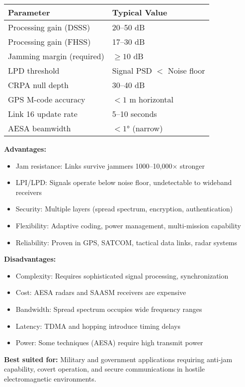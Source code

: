 \begin{center}
\begin{tabular}{ll}
\toprule
\textbf{Parameter} & \textbf{Typical Value} \\
\midrule
Processing gain (DSSS) & 20--50 dB \\
Processing gain (FHSS) & 17--30 dB \\
Jamming margin (required) & $\geq 10$ dB \\
LPD threshold & Signal PSD $<$ Noise floor \\
CRPA null depth & 30--40 dB \\
GPS M-code accuracy & $<1$ m horizontal \\
Link 16 update rate & 5--10 seconds \\
AESA beamwidth & $<1°$ (narrow) \\
\bottomrule
\end{tabular}
\end{center}

\textbf{Advantages:}
\begin{itemize}
\item Jam resistance: Links survive jammers 1000--10,000$\times$ stronger
\item LPI/LPD: Signals operate below noise floor, undetectable to wideband receivers
\item Security: Multiple layers (spread spectrum, encryption, authentication)
\item Flexibility: Adaptive coding, power management, multi-mission capability
\item Reliability: Proven in GPS, SATCOM, tactical data links, radar systems
\end{itemize}

\textbf{Disadvantages:}
\begin{itemize}
\item Complexity: Requires sophisticated signal processing, synchronization
\item Cost: AESA radars and SAASM receivers are expensive
\item Bandwidth: Spread spectrum occupies wide frequency ranges
\item Latency: TDMA and hopping introduce timing delays
\item Power: Some techniques (AESA) require high transmit power
\end{itemize}

\textbf{Best suited for:} Military and government applications requiring anti-jam capability, covert operation, and secure communications in hostile electromagnetic environments.

